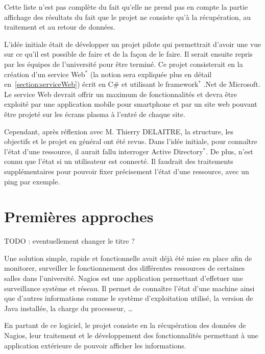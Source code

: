 Cette liste n'est pas compl\`ete du fait qu'elle ne prend pas en compte la partie \og{}affichage\fg{} des r\'esultats du fait que le projet ne consiste qu'\`a la r\'ecup\'eration, au traitement et au retour de donn\'ees.

L'id\'ee initiale \'etait de d\'evelopper un projet pilote qui permettrait d'avoir une vue sur ce qu'il est possible de faire et de la fa\c{c}on de le faire.
Il serait ensuite repris par les \'equipes de l'universit\'e pour \^etre termin\'e.
Ce projet consisterait en la cr\'eation d'un service Web$^*$ (la notion sera expliqu\'ee plus en d\'etail en~\ref{section:serviceWeb}) \'ecrit en C\# et utilisant le framework$^*$ .Net de Microsoft.
Le service Web devrait offrir un maximum de fonctionnalit\'es et devra \^etre exploit\'e par une application mobile pour smartphone et par un site web pouvant \^etre projet\'e sur les \'ecrans plasma \`a l'entr\'e de chaque site.

Cependant, apr\`es r\'eflexion avec M. Thierry DELAITRE, la structure, les objectifs et le projet en g\'en\'eral ont \'et\'e revus.
Dans l'id\'ee initiale, pour conna\^itre l'\'etat d'une ressource, il aurait fallu interroger Active Directory$^*$. 
De plus, n'est connu que l'\'etat si un utilisateur est connect\'e.
Il faudrait des traitements suppl\'ementaires pour pouvoir fixer pr\'ecisement l'\'etat d'une ressource, avec un ping par exemple.

\section{Premi\`eres approches}

 TODO : eventuellement changer le titre ?

Une solution simple, rapide et fonctionnelle avait d\'ej\`a \'et\'e mise en place afin de \og{}monitorer\fg{}, \cad{} surveiller le fonctionnement des diff\'erentes ressources de certaines salles dans l'universit\'e.
Nagios est une application permettant d'effetuer une surveillance syst\`eme et r\'eseau.
Il permet de conna\^itre l'\'etat d'une machine ainsi que d'autres informations comme le syst\`eme d'exploitation utilis\'e, la version de Java install\'ee, la charge du processeur, \ldots

En partant de ce logiciel, le projet consiste en la r\'ecup\'eration des donn\'ees de Nagios, leur traitement et le d\'eveloppement des fonctionnalit\'es permettant \`a une application ext\'erieure de pouvoir afficher les informations.

